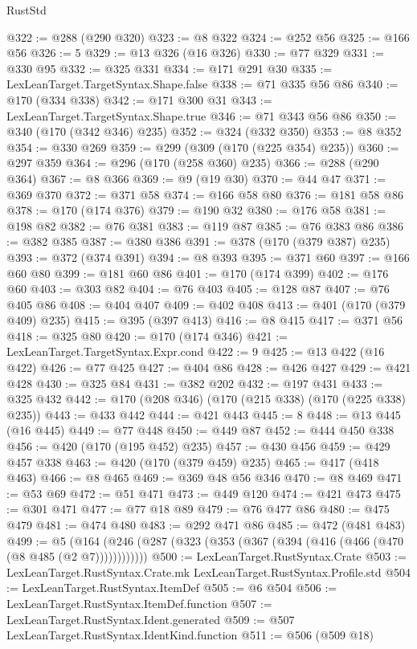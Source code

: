 \begin{lexlean}{RustStd}
\begin{coremodule}
{\begin{coremodule}
{{{{{{{{{{{{{{{@322 := @288 (@290 @320)
@323 := @8 @322
@324 := @252 @56
@325 := @166 @56
@326 := 5
@329 := @13 @326 (@16 @326)
@330 := @77 @329
@331 := @330 @95
@332 := @325 @331
@334 := @171 @291 @30
@335 := LexLeanTarget.TargetSyntax.Shape.false
@338 := @71 @335 @56 @86
@340 := @170 (@334 @338)
@342 := @171 @300 @31
@343 := LexLeanTarget.TargetSyntax.Shape.true
@346 := @71 @343 @56 @86
@350 := @340 (@170 (@342 @346) @235)
@352 := @324 (@332 @350)
@353 := @8 @352
@354 := @330 @269
@359 := @299 (@309 (@170 (@225 @354) @235))
@360 := @297 @359
@364 := @296 (@170 (@258 @360) @235)
@366 := @288 (@290 @364)
@367 := @8 @366
@369 := @9 (@19 @30)
@370 := @44 @47
@371 := @369 @370
@372 := @371 @58
@374 := @166 @58 @80
@376 := @181 @58 @86
@378 := @170 (@174 @376)
@379 := @190 @32
@380 := @176 @58
@381 := @198 @82
@382 := @76 @381
@383 := @119 @87
@385 := @76 @383 @86
@386 := @382 @385
@387 := @380 @386
@391 := @378 (@170 (@379 @387) @235)
@393 := @372 (@374 @391)
@394 := @8 @393
@395 := @371 @60
@397 := @166 @60 @80
@399 := @181 @60 @86
@401 := @170 (@174 @399)
@402 := @176 @60
@403 := @303 @82
@404 := @76 @403
@405 := @128 @87
@407 := @76 @405 @86
@408 := @404 @407
@409 := @402 @408
@413 := @401 (@170 (@379 @409) @235)
@415 := @395 (@397 @413)
@416 := @8 @415
@417 := @371 @56
@418 := @325 @80
@420 := @170 (@174 @346)
@421 := LexLeanTarget.TargetSyntax.Expr.cond
@422 := 9
@425 := @13 @422 (@16 @422)
@426 := @77 @425
@427 := @404 @86
@428 := @426 @427
@429 := @421 @428
@430 := @325 @84
@431 := @382 @202
@432 := @197 @431
@433 := @325 @432
@442 := @170 (@208 @346) (@170 (@215 @338) (@170 (@225 @338) @235))
@443 := @433 @442
@444 := @421 @443
@445 := 8
@448 := @13 @445 (@16 @445)
@449 := @77 @448
@450 := @449 @87
@452 := @444 @450 @338
@456 := @420 (@170 (@195 @452) @235)
@457 := @430 @456
@459 := @429 @457 @338
@463 := @420 (@170 (@379 @459) @235)
@465 := @417 (@418 @463)
@466 := @8 @465
@469 := @369 @48 @56 @346
@470 := @8 @469
@471 := @53 @69
@472 := @51 @471
@473 := @449 @120
@474 := @421 @473
@475 := @301 @471
@477 := @77 @18 @89
@479 := @76 @477 @86
@480 := @475 @479
@481 := @474 @480
@483 := @292 @471 @86
@485 := @472 (@481 @483)
@499 := @5 (@164 (@246 (@287 (@323 (@353 (@367 (@394 (@416 (@466 (@470 (@8 @485 (@2 @7))))))))))))
@500 := LexLeanTarget.RustSyntax.Crate
@503 := LexLeanTarget.RustSyntax.Crate.mk LexLeanTarget.RustSyntax.Profile.std
@504 := LexLeanTarget.RustSyntax.ItemDef
@505 := @6 @504
@506 := LexLeanTarget.RustSyntax.ItemDef.function
@507 := LexLeanTarget.RustSyntax.Ident.generated
@509 := @507 LexLeanTarget.RustSyntax.IdentKind.function
@511 := @506 (@509 @18)
}}}}}}}}}}}}}}}
\end{coremodule}}
\end{coremodule}
\end{lexlean}

